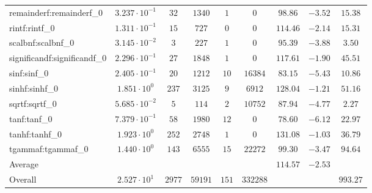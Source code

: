 \begin{tabular}{|l|c|c|c|c|c|c|c|c|}
remainderf:remainderf\_0     & $ 3.237 \cdot 10^{-1} $ & $ 32     $ & $ 1340  $ & $ 1   $ & $ 0      $ & $ 98.86       $ & $ -3.52   $ & $ 15.38   $ \\
rintf:rintf\_0               & $ 1.311 \cdot 10^{-1} $ & $ 15     $ & $ 727   $ & $ 0   $ & $ 0      $ & $ 114.46      $ & $ -2.14   $ & $ 15.31   $ \\
scalbnf:scalbnf\_0           & $ 3.145 \cdot 10^{-2} $ & $ 3      $ & $ 227   $ & $ 1   $ & $ 0      $ & $ 95.39       $ & $ -3.88   $ & $ 3.50    $ \\
significandf:significandf\_0 & $ 2.296 \cdot 10^{-1} $ & $ 27     $ & $ 1848  $ & $ 1   $ & $ 0      $ & $ 117.61      $ & $ -1.90   $ & $ 45.51   $ \\
sinf:sinf\_0                 & $ 2.405 \cdot 10^{-1} $ & $ 20     $ & $ 1212  $ & $ 10  $ & $ 16384  $ & $ 83.15       $ & $ -5.43   $ & $ 10.86   $ \\
sinhf:sinhf\_0               & $ 1.851 \cdot 10^{0}  $ & $ 237    $ & $ 3125  $ & $ 9   $ & $ 6912   $ & $ 128.04      $ & $ -1.21   $ & $ 51.16   $ \\
sqrtf:sqrtf\_0               & $ 5.685 \cdot 10^{-2} $ & $ 5      $ & $ 114   $ & $ 2   $ & $ 10752  $ & $ 87.94       $ & $ -4.77   $ & $ 2.27    $ \\
tanf:tanf\_0                 & $ 7.379 \cdot 10^{-1} $ & $ 58     $ & $ 1980  $ & $ 12  $ & $ 0      $ & $ 78.60       $ & $ -6.12   $ & $ 22.97   $ \\
tanhf:tanhf\_0               & $ 1.923 \cdot 10^{0}  $ & $ 252    $ & $ 2748  $ & $ 1   $ & $ 0      $ & $ 131.08      $ & $ -1.03   $ & $ 36.79   $ \\
tgammaf:tgammaf\_0           & $ 1.440 \cdot 10^{0}  $ & $ 143    $ & $ 6555  $ & $ 15  $ & $ 22272  $ & $ 99.30       $ & $ -3.47   $ & $ 94.64   $ \\
\hline
Average                      & $                     $ & $        $ & $       $ & $     $ & $        $ & $ 114.57      $ & $ -2.53   $ & $         $ \\
\hline
Overall                      & $ 2.527 \cdot 10^{1}  $ & $ 2977   $ & $ 59191 $ & $ 151 $ & $ 332288 $ & $             $ & $         $ & $ 993.27  $ \\
\hline
\end{tabular}
